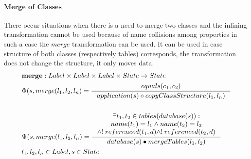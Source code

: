 \documentclass[11pt]{article}
\begin{document}
\paragraph{Merge of Classes} There occur situations when there is a need to merge two classes and the inlining transformation cannot be used because of name collisions among properties in such a case the $merge$ transformation can be used. It can be used in case structure of both classes (respectively tables) corresponds, the transformation does not change the structure, it only moves data. 
\begin{align*}
&	\mathbf{merge} : Label \times Label \times Label \times State \rightarrow State \\
&	\Phi(s, merge(l_1, l_2, l_n) = \inference{equals(c_1, c_2)}{application(s) \circ copyClassStructure(l_1, l_n)} \\\\
&	\Psi(s, merge(l_1, l_2, l_n) = \inference{\exists t_1, t_2 \in tables(database(s)) : \\ name(t_1) = l_1 \wedge name(t_2) = l_2 \\
\wedge ! \: referenced(t_1, d) \wedge ! \: referenced(t_2, d) }{database(s) \bullet mergeTables(l_1, l_2)}\\
& l_1, l_2, l_n \in Label, s \in State
\end{align*}

 
\end{document}

